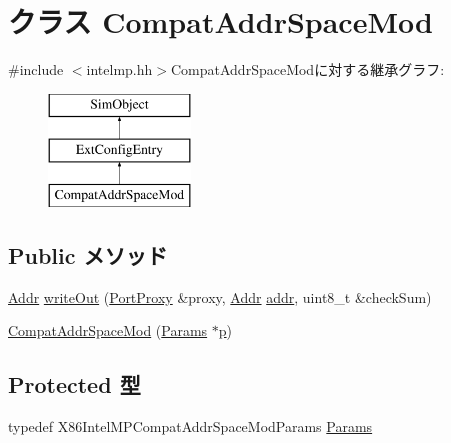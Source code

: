 \hypertarget{classX86ISA_1_1IntelMP_1_1CompatAddrSpaceMod}{
\section{クラス CompatAddrSpaceMod}
\label{classX86ISA_1_1IntelMP_1_1CompatAddrSpaceMod}
}


{\ttfamily \#include $<$intelmp.hh$>$}CompatAddrSpaceModに対する継承グラフ:\begin{figure}[H]
\begin{center}
\leavevmode
\includegraphics[height=3cm]{classX86ISA_1_1IntelMP_1_1CompatAddrSpaceMod}
\end{center}
\end{figure}
\subsection*{Public メソッド}
\begin{DoxyCompactItemize}
\item 
\hyperlink{base_2types_8hh_af1bb03d6a4ee096394a6749f0a169232}{Addr} \hyperlink{classX86ISA_1_1IntelMP_1_1CompatAddrSpaceMod_a5fffc1006b1f28bd779d83ffbe213b4f}{writeOut} (\hyperlink{classPortProxy}{PortProxy} \&proxy, \hyperlink{base_2types_8hh_af1bb03d6a4ee096394a6749f0a169232}{Addr} \hyperlink{namespaceX86ISA_ab705917f60c5566f9ce56a93f798b2e2}{addr}, uint8\_\-t \&checkSum)
\item 
\hyperlink{classX86ISA_1_1IntelMP_1_1CompatAddrSpaceMod_af087ea2f82b87e5ceb0ffdf54a2acc41}{CompatAddrSpaceMod} (\hyperlink{classX86ISA_1_1IntelMP_1_1CompatAddrSpaceMod_a5f6d926d4afade776b21c22d1811adf8}{Params} $\ast$\hyperlink{namespaceX86ISA_af675c1d542a25b96e11164b80809a856}{p})
\end{DoxyCompactItemize}
\subsection*{Protected 型}
\begin{DoxyCompactItemize}
\item 
typedef X86IntelMPCompatAddrSpaceModParams \hyperlink{classX86ISA_1_1IntelMP_1_1CompatAddrSpaceMod_a5f6d926d4afade776b21c22d1811adf8}{Params}
\end{DoxyCompactItemize}
